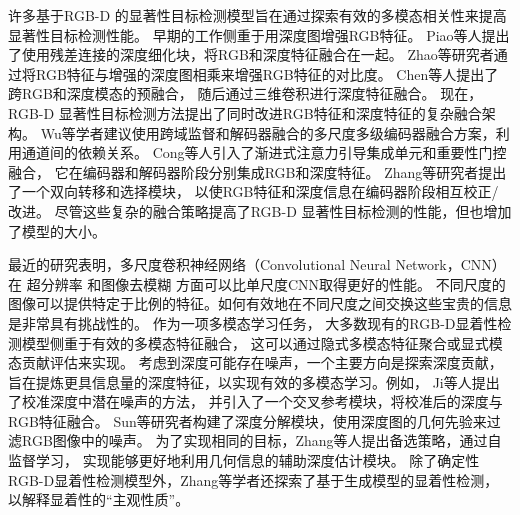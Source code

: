 许多基于RGB-D 的显著性目标检测模型旨在通过探索有效的多模态相关性来提高显著性目标检测性能。
早期的工作侧重于用深度图增强RGB特征。
Piao等人提出了使用残差连接的深度细化块，将RGB和深度特征融合在一起。
Zhao等研究者通过将RGB特征与增强的深度图相乘来增强RGB特征的对比度。
Chen等人提出了跨RGB和深度模态的预融合，
随后通过三维卷积进行深度特征融合。
现在，RGB-D 显著性目标检测方法提出了同时改进RGB特征和深度特征的复杂融合架构。
Wu等学者建议使用跨域监督和解码器融合的多尺度多级编码器融合方案，利用通道间的依赖关系。
Cong等人引入了渐进式注意力引导集成单元和重要性门控融合，
它在编码器和解码器阶段分别集成RGB和深度特征。
Zhang等研究者提出了一个双向转移和选择模块，
以使RGB特征和深度信息在编码器阶段相互校正/改进。
尽管这些复杂的融合策略提高了RGB-D 显著性目标检测的性能，但也增加了模型的大小。








最近的研究表明，多尺度卷积神经网络（Convolutional Neural Network，CNN）在
超分辨率
和图像去模糊
方面可以比单尺度CNN取得更好的性能。
不同尺度的图像可以提供特定于比例的特征。如何有效地在不同尺度之间交换这些宝贵的信息是非常具有挑战性的。
作为一项多模态学习任务，
大多数现有的RGB-D显着性检测模型侧重于有效的多模态特征融合，
这可以通过隐式多模态特征聚合或显式模态贡献评估来实现。
考虑到深度可能存在噪声，一个主要方向是探索深度贡献，
旨在提炼更具信息量的深度特征，以实现有效的多模态学习。例如，
Ji等人提出了校准深度中潜在噪声的方法，
并引入了一个交叉参考模块，将校准后的深度与RGB特征融合。
Sun等研究者构建了深度分解模块，使用深度图的几何先验来过滤RGB图像中的噪声。
为了实现相同的目标，Zhang等人提出备选策略，通过自监督学习，
实现能够更好地利用几何信息的辅助深度估计模块。
除了确定性RGB-D显着性检测模型外，Zhang等学者还探索了基于生成模型的显着性检测，
以解释显着性的“主观性质”。







